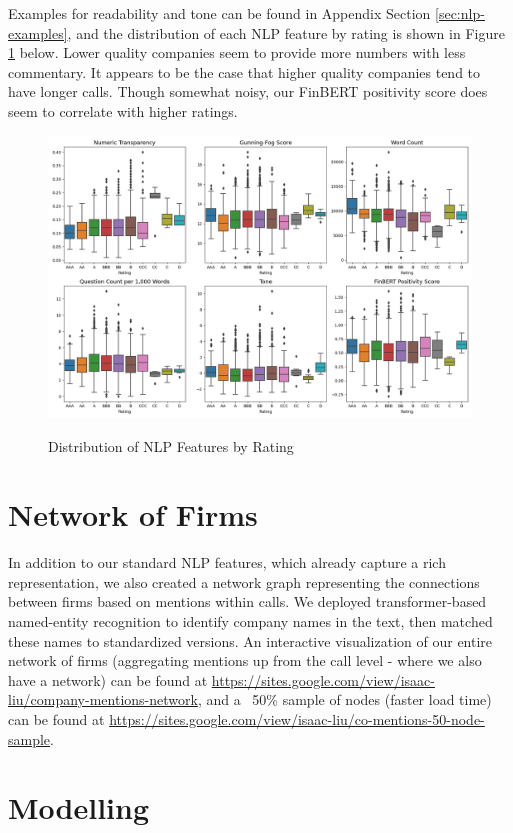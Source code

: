 \documentclass{article}[11pt]
\begin{document}
    Examples for readability and tone can be found in Appendix Section \ref{sec:nlp-examples}, and the distribution of each NLP feature by rating is shown in Figure \ref{fig:dist-nlp-by-rating} below. Lower quality companies seem to provide more numbers with less commentary. It appears to be the case that higher quality companies tend to have longer calls. Though somewhat noisy, our FinBERT positivity score does seem to correlate with higher ratings.

    \begin{figure}[h!]
		\centering
        \caption{Distribution of NLP Features by Rating}
        \includegraphics[width=0.6\linewidth,keepaspectratio=true]{../Output/NLP/hist_by_rating.png}
        \label{fig:dist-nlp-by-rating}
	\end{figure}

    \section*{Network of Firms}

    In addition to our standard NLP features, which already capture a rich representation, we also created a network graph representing the connections between firms based on mentions within calls. We deployed transformer-based named-entity recognition \citep{spacy_spacy_2024} to identify company names in the text, then matched these names to standardized versions. An interactive visualization of our entire network of firms (aggregating mentions up from the call level - where we also have a network) can be found at \url{https://sites.google.com/view/isaac-liu/company-mentions-network}, and a ~50\% sample of nodes (faster load time) can be found at \url{https://sites.google.com/view/isaac-liu/co-mentions-50-node-sample}.

    \section*{Modelling}
\end{document}
